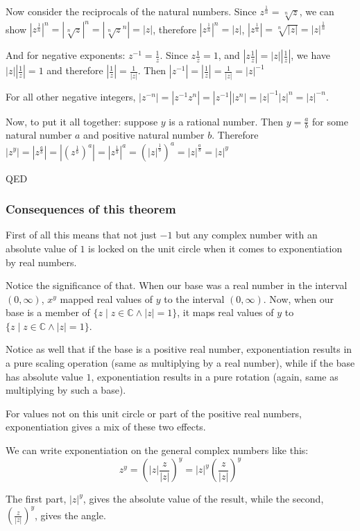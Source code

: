 \documentclass[11pt, oneside]{article}   	%
\begin{document}
Now consider the reciprocals of the natural numbers. Since \(z^\frac{1}{n}=\sqrt[n]z\), we can show 
\(|z^\frac{1}{n}|^n = |\sqrt[n]z|^n=|\sqrt[n]z^n|=|z|\), therefore \(|z^\frac{1}{n}|^n=|z|\), \(|z^\frac{1}{n}|=\sqrt[n]{|z|}=|z|^\frac{1}{n}\)

And for negative exponents: \(z^{-1} = \frac{1}{z}\). Since \(z\frac{1}{z}=1\), and \(|z\frac{1}{z}|=|z||\frac{1}{z}|\), we have \(|z||\frac{1}{z}|=1\) and therefore \(|\frac{1}{z}|=\frac{1}{|z|}\).
Then \(|z^{-1}|=|\frac{1}{z}|=\frac{1}{|z|}=|z|^{-1}\)

For all other negative integers, $|z^{-n}|=|z^{-1}z^n|=|z^{-1}||z^n|=|z|^{-1}|z|^n=|z|^{-n}$.

Now, to put it all together: suppose $y$ is a rational number. Then $y=\frac{a}{b}$ for some natural number $a$ and positive natural number $b$. Therefore \(|z^y|=|z^\frac{a}{b}|=|(z^\frac{1}{b})^a|=|z^{\frac{1}{b}}|^a=(|z|^\frac{1}{b})^a=|z|^\frac{a}{b}=|z|^y\) 

QED

\subsubsection{Consequences of this theorem}

First of all this means that not just $-1$ but any complex number with an absolute value of $1$ is locked on the unit circle when it comes to exponentiation by real numbers.

Notice the significance of that. When our base was a real number in the interval $(0,\infty)$, $x^y$ mapped real values of $y$ to the interval $(0, \infty)$. Now, when our base is a member of $\{z \mid z\in\mathbb{C} \land |z|=1\}$, it maps real values of $y$ to $\{z \mid z\in\mathbb{C} \land |z|=1\}$.

Notice as well that if the base is a positive real number, exponentiation results in a pure scaling operation (same as multiplying by a real number), while if the base has absolute value $1$, exponentiation results in a pure rotation (again, same as multiplying by such a base).

For values not on this unit circle or part of the positive real numbers, exponentiation gives a mix of these two effects.

We can write exponentiation on the general complex numbers like this:
\[z^y = (|z|\frac{z}{|z|})^y = |z|^y(\frac{z}{|z|})^y\]

The first part, $|z|^y$, gives the absolute value of the result, while the second, $(\frac{z}{|z|})^y$, gives the angle.
\end{document}
